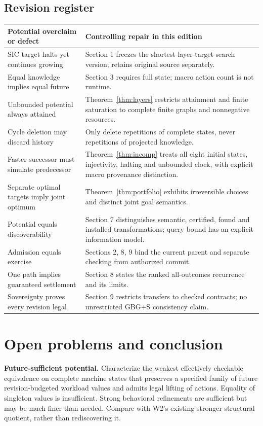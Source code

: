 \documentclass[11pt]{article}
\theoremstyle{remark}\newtheorem{remark}[theorem]{Remark}
\begin{document}
\subsection{Revision register}
\begin{center}\small
\begin{tabularx}{\textwidth}{@{}p{}X@{}}
\toprule Potential overclaim or defect & Controlling repair in this edition\\\midrule
SIC target halts yet continues growing & Section 1 freezes the shortest-layer target-search version; retains original source separately.\\
Equal knowledge implies equal future & Section 3 requires full state; macro action count is not runtime.\\
Unbounded potential always attained & Theorem~\ref{thm:layers} restricts attainment and finite saturation to complete finite graphs and nonnegative resources.\\
Cycle deletion may discard history & Only delete repetitions of complete states, never repetitions of projected knowledge.\\
Faster successor must simulate predecessor & Theorem~\ref{thm:incomp} treats all eight initial states, injectivity, halting and unbounded clock, with explicit macro provenance distinction.\\
Separate optimal targets imply joint optimum & Theorem~\ref{thm:portfolio} exhibits irreversible choices and distinct joint goal semantics.\\
Potential equals discoverability & Section 7 distinguishes semantic, certified, found and installed transformations; query bound has an explicit information model.\\
Admission equals exercise & Sections 2, 8, 9 bind the current parent and separate checking from authorized commit.\\
One path implies guaranteed settlement & Section 8 states the ranked all-outcomes recurrence and its limits.\\
Sovereignty proves every revision legal & Section 9 restricts transfers to checked contracts; no unrestricted GBG+S consistency claim.\\\bottomrule
\end{tabularx}
\end{center}

\section{Open problems and conclusion}
\textbf{Future-sufficient potential.} Characterize the weakest effectively checkable equivalence on complete machine states that preserves a specified family of future revision-budgeted workload values and admits legal lifting of actions. Equality of singleton values is insufficient. Strong behavioral refinements are sufficient but may be much finer than needed. Compare with W2's existing stronger structural quotient, rather than rediscovering it.
\end{document}
